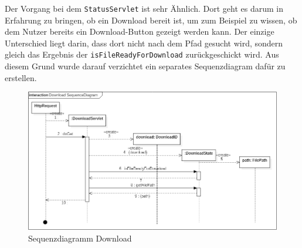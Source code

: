 Der Vorgang bei dem \texttt{StatusServlet} ist sehr Ähnlich. Dort geht es darum in Erfahrung zu bringen, ob ein Download bereit ist, um zum Beispiel zu wissen, ob dem Nutzer bereits ein Download-Button gezeigt werden kann. Der einzige Unterschied liegt darin, dass dort nicht nach dem Pfad gesucht wird, sondern gleich das Ergebnis der \texttt{isFileReadyForDownload} zurückgeschickt wird. Aus diesem Grund wurde darauf verzichtet ein separates Sequenzdiagram dafür zu erstellen.
\begin{figure}[!hbp]
	\centering
	\includegraphics[width=\linewidth]{images/export/DownloadSequenceDiagram.png}
	\caption{Sequenzdiagramm Download}
\end{figure}
